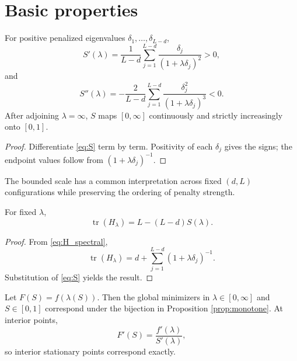 \section{Basic properties}

\begin{proposition}
\label{prop:monotone}
For positive penalized eigenvalues $\delta_1,\ldots,\delta_{L-d}$,
\begin{equation}
\label{eq:smoothness_first_derivative}
S'(\lambda)
=
\frac{1}{L-d}
\sum_{j=1}^{L-d}
\frac{\delta_j}{(1+\lambda\delta_j)^2}
>0,
\end{equation}
and
\begin{equation}
\label{eq:smoothness_second_derivative}
S''(\lambda)
=
-\frac{2}{L-d}
\sum_{j=1}^{L-d}
\frac{\delta_j^2}{(1+\lambda\delta_j)^3}
<0.
\end{equation}
After adjoining $\lambda=\infty$, $S$ maps $[0,\infty]$ continuously and strictly increasingly onto $[0,1]$.
\end{proposition}

\begin{proof}
Differentiate \cref{eq:S} term by term. Positivity of each $\delta_j$ gives the signs; the endpoint values follow from $(1+\lambda\delta_j)^{-1}$.
\end{proof}

The bounded scale has a common interpretation across fixed $(d,L)$ configurations while preserving the ordering of penalty strength.

\begin{proposition}
\label{prop:edf}
For fixed $\lambda$,
\begin{equation}
\label{eq:edf_smoothness_formula}
\operatorname{tr}(H_\lambda)=L-(L-d)S(\lambda).
\end{equation}
\end{proposition}

\begin{proof}
From \cref{eq:H_spectral},
\begin{equation}
\label{eq:edf_spectral_trace}
\operatorname{tr}(H_\lambda)
=
d+\sum_{j=1}^{L-d}(1+\lambda\delta_j)^{-1}.
\end{equation}
Substitution of \cref{eq:S} yields the result.
\end{proof}

\begin{proposition}
\label{prop:equiv}
Let $F(S)=f(\lambda(S))$. Then the global minimizers in $\lambda\in[0,\infty]$ and $S\in[0,1]$ correspond under the bijection in Proposition \cref{prop:monotone}. At interior points,
\begin{equation}
\label{eq:loss_change_of_variables}
F'(S)=\frac{f'(\lambda)}{S'(\lambda)},
\end{equation}
so interior stationary points correspond exactly.
\end{proposition}

